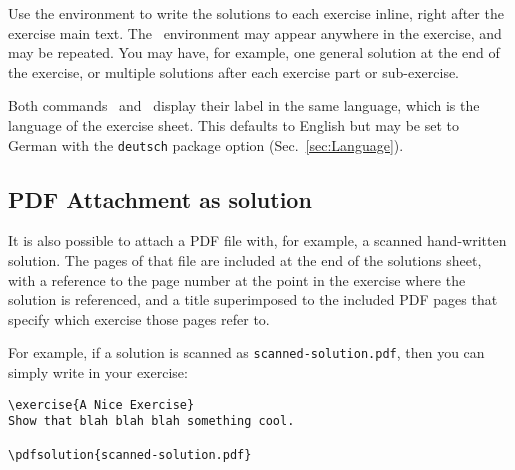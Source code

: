 \documentclass[11pt,a4paper]{article}
\begin{document}
Use the  environment to write the solutions to each exercise inline,
right after the exercise main text. 
The~ environment may appear anywhere in the exercise, and may be
repeated. You may have, for example, one general solution at the end of the exercise, or
multiple solutions after each exercise part or sub-exercise.



\begin{pkgnotice}
  Both commands~ and~ display their label in the same
  language, which is the language of the exercise sheet. This defaults to English but may
  be set to German with the {\tt deutsch} package option (Sec.~\ref{sec:Language}).
\end{pkgnotice}


\subsection{PDF Attachment as solution}

It is also possible to attach a PDF file with, for example, a scanned hand-written
solution. The pages of that file are included at the end of the solutions sheet, with a
reference to the page number at the point in the exercise where the solution is
referenced, and a title superimposed to the included PDF pages that specify which exercise
those pages refer to.

For example, if a solution is scanned as \texttt{scanned-solution.pdf}, then you can
simply write in your exercise:
\begin{pkgverbatim}
\begin{verbatim}
\exercise{A Nice Exercise}
Show that blah blah blah something cool.

\pdfsolution{scanned-solution.pdf}

\end{verbatim}
\end{pkgverbatim}
\end{document}
